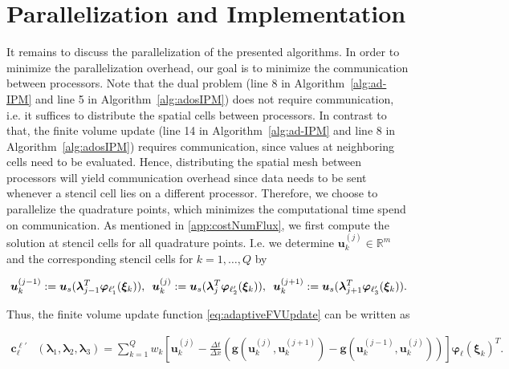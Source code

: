 \section{Parallelization and Implementation}
\label{sec:parallel}
It remains to discuss the parallelization of the presented algorithms. In order to minimize the parallelization overhead, our goal is to minimize the communication between processors. Note that the dual problem (line 8 in Algorithm~\ref{alg:ad-IPM} and line 5 in Algorithm~\ref{alg:adosIPM}) does not require communication, i.e. it suffices to distribute the spatial cells between processors. In contrast to that, the finite volume update (line 14 in Algorithm~\ref{alg:ad-IPM} and line 8 in Algorithm~\ref{alg:adosIPM}) requires communication, since values at neighboring cells need to be evaluated. Hence, distributing the spatial mesh between processors will yield communication overhead since data needs to be sent whenever a stencil cell lies on a different processor. Therefore, we choose to parallelize the quadrature points, which minimizes the computational time spend on communication. As mentioned in \ref{app:costNumFlux}, we first compute the solution at stencil cells for all quadrature points. I.e. we determine $\bm u^{(j)}_k\in\mathbb{R}^m$ and the corresponding stencil cells for $k = 1,\dots,Q$ by
\begin{linenomath*}\begin{align*}
\bm u^{(j-1)}_k := \bm u_{s}(\bm{\lambda}_{j-1}^T\bm{\varphi}_{\ell_1'}(\bm \xi_k)), \enskip \bm u^{(j)}_k := \bm u_{s}(\bm{\lambda}_{j}^T\bm{\varphi}_{\ell_2'}(\bm \xi_k)), \enskip \bm u^{(j+1)}_k := \bm u_{s}(\bm{\lambda}_{j+1}^T\bm{\varphi}_{\ell_3'}(\bm \xi_k)).
\end{align*}\end{linenomath*}
Thus, the finite volume update function \eqref{eq:adaptiveFVUpdate} can be written as
\begin{linenomath*}\begin{align}\label{eq:momentUpQuadrature}
\bm{c}_{\ell}^{\bm{\ell}'}&\left(\bm{\lambda}_{1},\bm{\lambda}_2,\bm{\lambda}_3\right)=\sum_{k=1}^Q w_k \left[\bm u^{(j)}_k- \frac{\Delta t}{\Delta x}\left(\bm g( \bm u^{(j)}_k,\bm u^{(j+1)}_k )- \bm g( \bm u^{(j-1)}_k,\bm u^{(j)}_k )\right)\right]\bm{\varphi}_{\ell}(\bm \xi_k)^T.
\end{align}\end{linenomath*}
